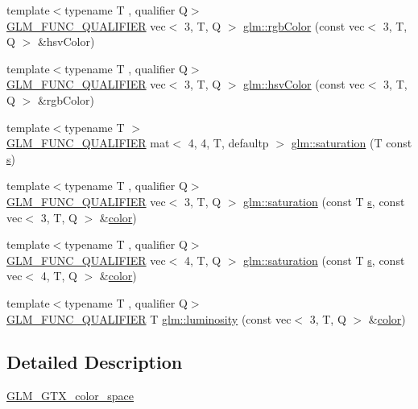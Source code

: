 \begin{DoxyCompactItemize}
\item 
{\footnotesize template$<$typename T , qualifier Q$>$ }\\\mbox{\hyperlink{setup_8hpp_a33fdea6f91c5f834105f7415e2a64407}{G\+L\+M\+\_\+\+F\+U\+N\+C\+\_\+\+Q\+U\+A\+L\+I\+F\+I\+ER}} vec$<$ 3, T, Q $>$ \mbox{\hyperlink{group__gtx__color__space_ga5f9193be46f45f0655c05a0cdca006db}{glm\+::rgb\+Color}} (const vec$<$ 3, T, Q $>$ \&hsv\+Color)
\item 
{\footnotesize template$<$typename T , qualifier Q$>$ }\\\mbox{\hyperlink{setup_8hpp_a33fdea6f91c5f834105f7415e2a64407}{G\+L\+M\+\_\+\+F\+U\+N\+C\+\_\+\+Q\+U\+A\+L\+I\+F\+I\+ER}} vec$<$ 3, T, Q $>$ \mbox{\hyperlink{group__gtx__color__space_ga789802bec2d4fe0f9741c731b4a8a7d8}{glm\+::hsv\+Color}} (const vec$<$ 3, T, Q $>$ \&rgb\+Color)
\item 
{\footnotesize template$<$typename T $>$ }\\\mbox{\hyperlink{setup_8hpp_a33fdea6f91c5f834105f7415e2a64407}{G\+L\+M\+\_\+\+F\+U\+N\+C\+\_\+\+Q\+U\+A\+L\+I\+F\+I\+ER}} mat$<$ 4, 4, T, defaultp $>$ \mbox{\hyperlink{group__gtx__color__space_ga01a97152b44e1550edcac60bd849e884}{glm\+::saturation}} (T const \mbox{\hyperlink{_s_d_l__opengl_8h_a4af680a6c683f88ed67b76f207f2e6e4}{s}})
\item 
{\footnotesize template$<$typename T , qualifier Q$>$ }\\\mbox{\hyperlink{setup_8hpp_a33fdea6f91c5f834105f7415e2a64407}{G\+L\+M\+\_\+\+F\+U\+N\+C\+\_\+\+Q\+U\+A\+L\+I\+F\+I\+ER}} vec$<$ 3, T, Q $>$ \mbox{\hyperlink{group__gtx__color__space_ga2156cea600e90148ece5bc96fd6db43a}{glm\+::saturation}} (const T \mbox{\hyperlink{_s_d_l__opengl_8h_a4af680a6c683f88ed67b76f207f2e6e4}{s}}, const vec$<$ 3, T, Q $>$ \&\mbox{\hyperlink{_s_d_l__opengl__glext_8h_a3ea846f998d64f079b86052b6c4193a8}{color}})
\item 
{\footnotesize template$<$typename T , qualifier Q$>$ }\\\mbox{\hyperlink{setup_8hpp_a33fdea6f91c5f834105f7415e2a64407}{G\+L\+M\+\_\+\+F\+U\+N\+C\+\_\+\+Q\+U\+A\+L\+I\+F\+I\+ER}} vec$<$ 4, T, Q $>$ \mbox{\hyperlink{group__gtx__color__space_gaba0eacee0736dae860e9371cc1ae4785}{glm\+::saturation}} (const T \mbox{\hyperlink{_s_d_l__opengl_8h_a4af680a6c683f88ed67b76f207f2e6e4}{s}}, const vec$<$ 4, T, Q $>$ \&\mbox{\hyperlink{_s_d_l__opengl__glext_8h_a3ea846f998d64f079b86052b6c4193a8}{color}})
\item 
{\footnotesize template$<$typename T , qualifier Q$>$ }\\\mbox{\hyperlink{setup_8hpp_a33fdea6f91c5f834105f7415e2a64407}{G\+L\+M\+\_\+\+F\+U\+N\+C\+\_\+\+Q\+U\+A\+L\+I\+F\+I\+ER}} T \mbox{\hyperlink{group__gtx__color__space_gad028e0a4f1a9c812b39439b746295b34}{glm\+::luminosity}} (const vec$<$ 3, T, Q $>$ \&\mbox{\hyperlink{_s_d_l__opengl__glext_8h_a3ea846f998d64f079b86052b6c4193a8}{color}})
\end{DoxyCompactItemize}


\subsection{Detailed Description}
\mbox{\hyperlink{group__gtx__color__space}{G\+L\+M\+\_\+\+G\+T\+X\+\_\+color\+\_\+space}} 